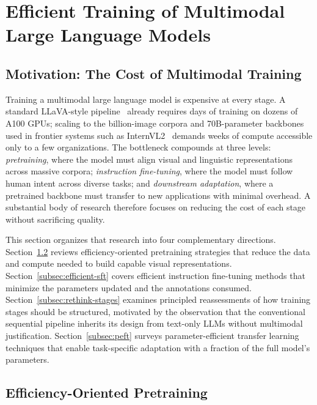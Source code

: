 
\section{Efficient Training of Multimodal Large Language Models}
\label{sec:efficient-training}

\subsection{Motivation: The Cost of Multimodal Training}
\label{subsec:training-motivation}

Training a multimodal large language model is expensive at every stage. A standard LLaVA-style pipeline~\cite{Liu202304828,Liu202310999} already requires days of training on dozens of A100 GPUs; scaling to the billion-image corpora and 70B-parameter backbones used in frontier systems such as InternVL2~\cite{Chen202413948} demands weeks of compute accessible only to a few organizations. The bottleneck compounds at three levels: \emph{pretraining}, where the model must align visual and linguistic representations across massive corpora; \emph{instruction fine-tuning}, where the model must follow human intent across diverse tasks; and \emph{downstream adaptation}, where a pretrained backbone must transfer to new applications with minimal overhead. A substantial body of research therefore focuses on reducing the cost of each stage without sacrificing quality.

This section organizes that research into four complementary directions. Section~\ref{subsec:efficient-pretrain} reviews efficiency-oriented pretraining strategies that reduce the data and compute needed to build capable visual representations. Section~\ref{subsec:efficient-sft} covers efficient instruction fine-tuning methods that minimize the parameters updated and the annotations consumed. Section~\ref{subsec:rethink-stages} examines principled reassessments of how training stages should be structured, motivated by the observation that the conventional sequential pipeline inherits its design from text-only LLMs without multimodal justification. Section~\ref{subsec:peft} surveys parameter-efficient transfer learning techniques that enable task-specific adaptation with a fraction of the full model's parameters.

\subsection{Efficiency-Oriented Pretraining}
\label{subsec:efficient-pretrain}

